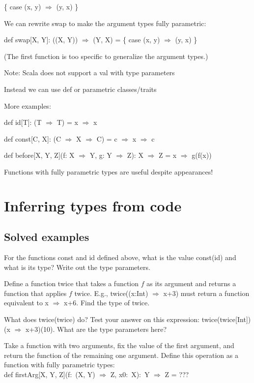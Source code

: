   \{ case (x, y) $\Rightarrow$ (y, x) \} 

We can rewrite swap to make the argument types fully parametric:

def swap{[}X, Y{]}: ((X, Y)) $\Rightarrow$ (Y, X) = \{ case (x, y)
$\Rightarrow$ (y, x) \} 

(The first function is too specific to generalize the argument types.)

Note: Scala does not support a val with type parameters

Instead we can use def or parametric classes/traits

More examples:

def id{[}T{]}: (T $\Rightarrow$ T) = x $\Rightarrow$ x

def const{[}C, X{]}: (C $\Rightarrow$ X $\Rightarrow$ C) = c $\Rightarrow$
x $\Rightarrow$ c

def before{[}X, Y, Z{]}(f: X $\Rightarrow$ Y, g: Y $\Rightarrow$
Z): X $\Rightarrow$ Z = x $\Rightarrow$ g(f(x))

Functions with fully parametric types are useful despite appearances!

\section{Inferring types from code}

\subsection{Solved examples}

For the functions const and id defined above, what is the value const(id)
and what is its type? Write out the type parameters.

Define a function twice that takes a function $f$ as its argument
and returns a function that applies $f$ twice. E.g., twice((x:Int)
$\Rightarrow$ x+3) must return a function equivalent to x $\Rightarrow$
x+6. Find the type of twice.

What does twice(twice) do? Test your answer on this expression: twice(twice{[}Int{]})(x
$\Rightarrow$ x+3)(10). What are the type parameters here?

Take a function with two arguments, fix the value of the first argument,
and return the function of the remaining one argument. Define this
operation as a function with fully parametric types:\\
def firstArg{[}X, Y, Z{]}(f:~(X, Y) $\Rightarrow$ Z, x0:~X):~Y
$\Rightarrow$ Z = ???

